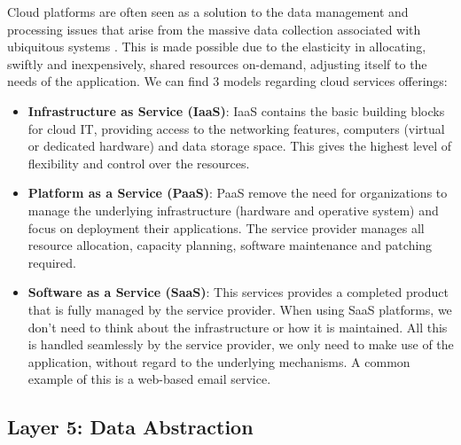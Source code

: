 Cloud platforms are often seen as a solution to the data management and processing issues that arise from the massive data collection associated with ubiquitous systems \cite{Baker2017}. This is made possible due to the elasticity in allocating, swiftly and inexpensively, shared resources on-demand, adjusting itself to the needs of the application. We can find 3 models regarding cloud services offerings:

\begin{itemize}
    \item \textbf{Infrastructure as Service (IaaS)}: IaaS contains the basic building blocks for cloud IT, providing access to the networking features, computers (virtual or dedicated hardware) and data storage space. This gives the highest level of flexibility and control over the resources.
    \item \textbf{Platform as a Service (PaaS)}: PaaS remove the need for organizations to manage the underlying infrastructure (hardware and operative system) and focus on deployment their applications. The service provider manages all resource allocation, capacity planning, software maintenance and patching required.
    \item \textbf{Software as a Service (SaaS)}: This services provides a completed product that is fully managed by the service provider. When using SaaS platforms, we don't need to think about the infrastructure or how it is maintained. All this is handled seamlessly by the service provider, we only need to make use of the application, without regard to the underlying mechanisms. A common example of this is a web-based email service. 
\end{itemize}

\subsection{Layer 5: Data Abstraction}
\label{sec:iot-model-layer5}





